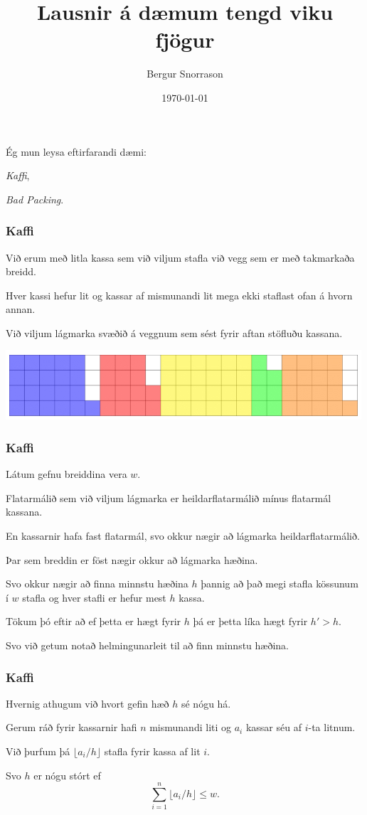 \title{Lausnir á dæmum tengd viku fjögur}
\author{Bergur Snorrason}
\date{\today}



\frame{\titlepage}

{
	{
		\item<1-> Ég mun leysa eftirfarandi dæmi:
		{
			\item<2-> \emph{Kaffi},
			\item<3-> \emph{Bad Packing}.
		}
	}
}

{
	\frametitle{Kaffi}
	{
		\item<1-> Við erum með litla kassa sem við viljum stafla við vegg sem er með takmarkaða breidd.
		\item<2-> Hver kassi hefur lit og kassar af mismunandi lit mega ekki staflast ofan á hvorn annan.
		\item<3-> Við viljum lágmarka svæðið á veggnum sem sést fyrir aftan stöfluðu kassana.
		\item<4->[] \includegraphics[scale = 0.5]{fig/kaffi.png}
	}
}

{
	\frametitle{Kaffi}
	{
		\item<1-> Látum gefnu breiddina vera $w$.
		\item<2-> Flatarmálið sem við viljum lágmarka er heildarflatarmálið mínus flatarmál kassana.
		\item<3-> En kassarnir hafa fast flatarmál, svo okkur nægir að lágmarka heildarflatarmálið.
		\item<4-> Þar sem breddin er föst nægir okkur að lágmarka hæðina.
		\item<5-> Svo okkur nægir að finna minnstu hæðina $h$ þannig að það megi stafla kössunum í $w$ stafla og hver stafli er hefur mest $h$ kassa.
		\item<6-> Tökum þó eftir að ef þetta er hægt fyrir $h$ þá er þetta líka hægt fyrir $h' > h$.
		\item<7-> Svo við getum notað helmingunarleit til að finn minnstu hæðina.
	}
}

{
	\frametitle{Kaffi}
	{
		\item<1-> Hvernig athugum við hvort gefin hæð $h$ sé nógu há.
		\item<2-> Gerum ráð fyrir kassarnir hafi $n$ mismunandi liti og $a_i$ kassar séu af $i$-ta litnum.
		\item<3-> Við þurfum þá $\lfloor a_i/h \rfloor$ stafla fyrir kassa af lit $i$.
		\item<4-> Svo $h$ er nógu stórt ef
		\[
			\sum_{i = 1}^n \lfloor a_i/h \rfloor \leq w.
		\]
	}
}

